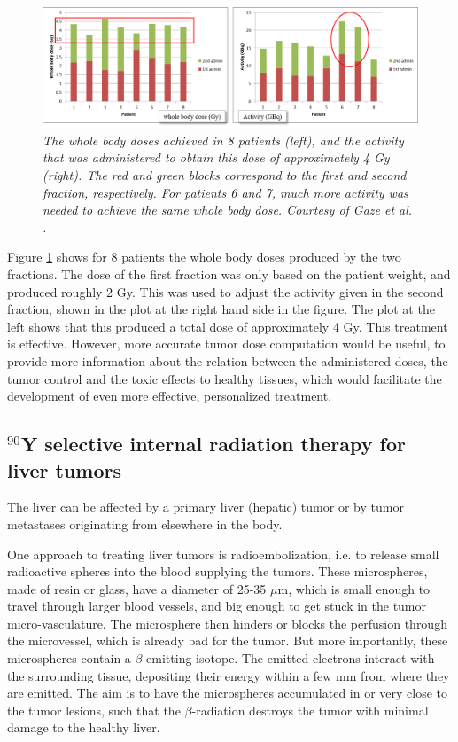 \begin{figure}[tb]
\centering
\includegraphics[width=\textwidth]{figs/fig_mIBG.png}
\caption{\label{fig:mibg} \emph{The whole body doses achieved in 8
    patients (left), and the activity that was administered to obtain
    this dose of approximately 4 Gy (right). The red and green blocks
    correspond to the first and second fraction, respectively. For
    patients 6 and 7, much more activity was needed to achieve the
    same whole body dose. Courtesy of Gaze et al. \cite{Sangro2012}.}}
\end{figure}
%
Figure \ref{fig:mibg} shows for 8 patients the whole body doses
produced by the two fractions. The dose of the first fraction was only
based on the patient weight, and produced roughly 2 Gy. This was used
to adjust the activity given in the second fraction, shown in the plot at
the right hand side in the figure. The plot at the left shows that
this produced a total dose of approximately 4 Gy. This treatment is
effective. However, more accurate tumor dose computation would be
useful, to provide more information about the relation between the
administered doses, the tumor control and the toxic effects to healthy
tissues, which would facilitate the development of even more effective,
personalized treatment.


\subsection{$^{90}$Y selective internal radiation therapy for liver tumors}
The liver can be affected by a primary liver (hepatic) tumor or by
tumor metastases originating from elsewhere in the body.

One approach to treating liver tumors is radioembolization, i.e. to
release small radioactive spheres into the blood supplying the
tumors. These microspheres, made of resin or glass, have a diameter of
25-35 $\mu$m, which is small enough to travel through larger blood
vessels, and big enough to get stuck in the tumor
micro-vasculature. The microsphere then hinders or blocks the
perfusion through the microvessel, which is already bad for the
tumor. But more importantly, these microspheres contain a
$\beta$-emitting isotope. The emitted electrons interact with the
surrounding tissue, depositing their energy within a few mm from where
they are emitted. The aim is to have the microspheres accumulated in
or very close to the tumor lesions, such that the $\beta$-radiation
destroys the tumor with minimal damage to the healthy liver.

